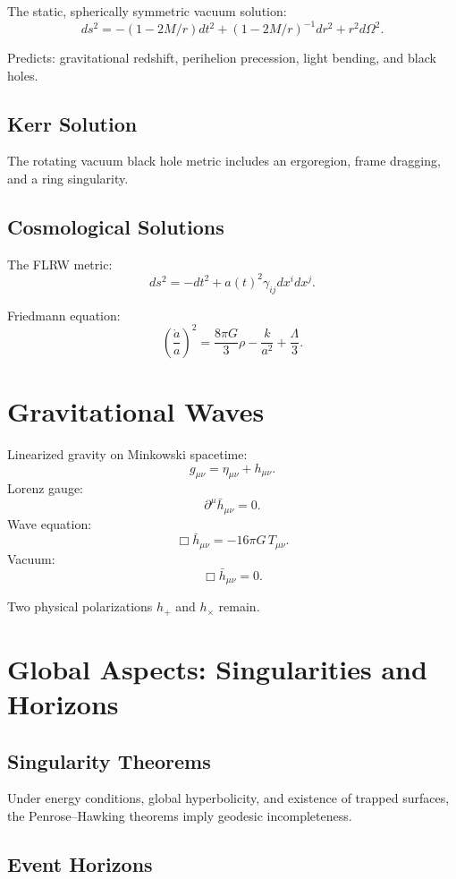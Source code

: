 \documentclass[12pt]{article}
\begin{document}
The static, spherically symmetric vacuum solution:
\[
ds^2 = -(1-2M/r)dt^2 + (1-2M/r)^{-1}dr^2 + r^2 d\Omega^2.
\]

Predicts:
gravitational redshift, perihelion precession, light bending, and black holes.

\subsection{Kerr Solution}

The rotating vacuum black hole metric includes an ergoregion, frame dragging,
and a ring singularity.

\subsection{Cosmological Solutions}

The FLRW metric:
\[
ds^2 = -dt^2 + a(t)^2 \gamma_{ij}dx^i dx^j.
\]

Friedmann equation:
\[
\left(\frac{\dot{a}}{a}\right)^2 = \frac{8\pi G}{3}\rho
  - \frac{k}{a^2} + \frac{\Lambda}{3}.
\]

\section{Gravitational Waves}

Linearized gravity on Minkowski spacetime:
\[
g_{\mu\nu}=\eta_{\mu\nu}+h_{\mu\nu}.
\]
Lorenz gauge:
\[
\partial^\mu \bar{h}_{\mu\nu}=0.
\]
Wave equation:
\[
\Box \bar{h}_{\mu\nu} = -16\pi G\, T_{\mu\nu}.
\]
Vacuum:
\[
\Box \bar{h}_{\mu\nu}=0.
\]

Two physical polarizations $h_+$ and $h_\times$ remain.

\section{Global Aspects: Singularities and Horizons}

\subsection{Singularity Theorems}

Under energy conditions, global hyperbolicity, and existence of trapped 
surfaces, the Penrose--Hawking theorems imply geodesic incompleteness.

\subsection{Event Horizons}
\end{document}
